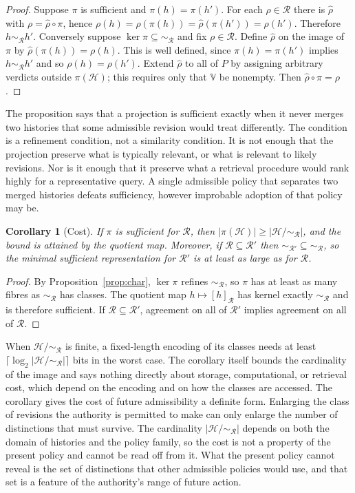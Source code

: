 \documentclass[11pt]{article}
\newtheorem{corollary}{Corollary}
\theoremstyle{remark}
\newcommand{\Hist}{\mathcal{H}}
\newcommand{\Rev}{\mathcal{R}}
\newcommand{\Vset}{\mathbb{V}}
\renewcommand{\ker}{\operatorname{ker}}
\begin{document}
\begin{proof}
Suppose $\pi$ is sufficient and $\pi(h)=\pi(h')$. For each $\rho\in\Rev$ there is $\hat\rho$ with $\rho=\hat\rho\circ\pi$, hence $\rho(h)=\hat\rho(\pi(h))=\hat\rho(\pi(h'))=\rho(h')$. Therefore $h\sim_{\Rev}h'$. Conversely suppose $\ker\pi\subseteq{\sim_{\Rev}}$ and fix $\rho\in\Rev$. Define $\hat\rho$ on the image of $\pi$ by $\hat\rho(\pi(h))=\rho(h)$. This is well defined, since $\pi(h)=\pi(h')$ implies $h\sim_{\Rev}h'$ and so $\rho(h)=\rho(h')$. Extend $\hat\rho$ to all of $P$ by assigning arbitrary verdicts outside $\pi(\Hist)$; this requires only that $\Vset$ be nonempty. Then $\hat\rho\circ\pi=\rho$.
\end{proof}

The proposition says that a projection is sufficient exactly when it never merges two histories that some admissible revision would treat differently. The condition is a refinement condition, not a similarity condition. It is not enough that the projection preserve what is typically relevant, or what is relevant to likely revisions. Nor is it enough that it preserve what a retrieval procedure would rank highly for a representative query. A single admissible policy that separates two merged histories defeats sufficiency, however improbable adoption of that policy may be.

\begin{corollary}[Cost]\label{cor:cost}
If $\pi$ is sufficient for $\Rev$, then $|\pi(\Hist)|\ge |\Hist/{\sim_{\Rev}}|$, and the bound is attained by the quotient map. Moreover, if $\Rev\subseteq\Rev'$ then $\sim_{\Rev'}\subseteq\sim_{\Rev}$, so the minimal sufficient representation for $\Rev'$ is at least as large as for $\Rev$.
\end{corollary}

\begin{proof}
By Proposition~\ref{prop:char}, $\ker\pi$ refines $\sim_{\Rev}$, so $\pi$ has at least as many fibres as $\sim_{\Rev}$ has classes. The quotient map $h\mapsto[h]_{\Rev}$ has kernel exactly $\sim_{\Rev}$ and is therefore sufficient. If $\Rev\subseteq\Rev'$, agreement on all of $\Rev'$ implies agreement on all of $\Rev$.
\end{proof}

When $\Hist/{\sim_{\Rev}}$ is finite, a fixed-length encoding of its classes needs at least $\lceil\log_2|\Hist/{\sim_{\Rev}}|\rceil$ bits in the worst case. The corollary itself bounds the cardinality of the image and says nothing directly about storage, computational, or retrieval cost, which depend on the encoding and on how the classes are accessed. The corollary gives the cost of future admissibility a definite form. Enlarging the class of revisions the authority is permitted to make can only enlarge the number of distinctions that must survive. The cardinality $|\Hist/{\sim_{\Rev}}|$ depends on both the domain of histories and the policy family, so the cost is not a property of the present policy and cannot be read off from it. What the present policy cannot reveal is the set of distinctions that other admissible policies would use, and that set is a feature of the authority's range of future action.
\end{document}
